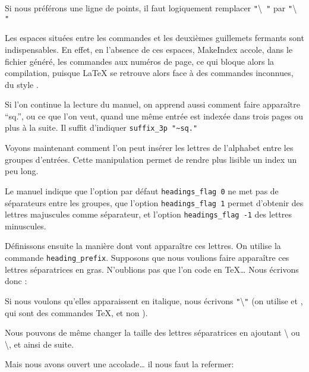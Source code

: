 Si nous préférons une ligne de points, il faut logiquement remplacer \verb|"|\textbackslash{}\verb| "| par \verb|"|\textbackslash{}\verb| "|

\begin{attention}
Les espaces situées entre les commandes et les deuxièmes guillemets fermants sont indispensables. En effet, en l'absence de ces espaces, MakeIndex accole, dans le fichier  généré, les commandes aux numéros de page, ce qui bloque alors  la   compilation, puisque \LaTeX{} se retrouve alors face à des commandes inconnues, du style .
\end{attention}

Si l'on continue la lecture du manuel, on apprend aussi comment faire apparaître \enquote{sq.}, ou ce que l'on veut, quand une même entrée est indexée dans trois pages ou plus à la suite. Il suffit d'indiquer \verb+suffix_3p "~sq."+

Voyons maintenant comment l'on peut insérer les lettres de l'alphabet entre les groupes d'entrées. Cette manipulation permet de rendre plus lisible un index un peu long. 

Le manuel indique que l'option par défaut \verb+headings_flag 0+ ne met pas de séparateurs entre les groupes, que l'option \verb+headings_flag 1+ permet d'obtenir des lettres majuscules comme séparateur, et l'option  \verb+headings_flag -1+ des lettres minuscules.

Définissons ensuite la manière dont vont apparaître ces lettres. On utilise la commande \verb|heading_prefix|. Supposons que nous voulions faire apparaître ces lettres séparatrices en gras. N'oublions pas que l'on code en \TeX … Nous écrivons donc :

\begin{latexcode}
heading_prefix "{\\bfseries "
\end{latexcode} 

Si nous voulons qu'elles apparaissent en italique, nous écrivons \verb|"|\textbackslash{}\verb|"| (on utilise  et , qui sont des commandes \TeX, et non  ).

Nous  pouvons de même changer la taille des lettres séparatrices en ajoutant \textbackslash{} ou \textbackslash{}, et ainsi de suite. 

Mais nous avons ouvert une accolade… il nous faut la refermer:

\begin{latexcode}
heading_suffix " }\\nopagebreak\n " 
\end{latexcode}

